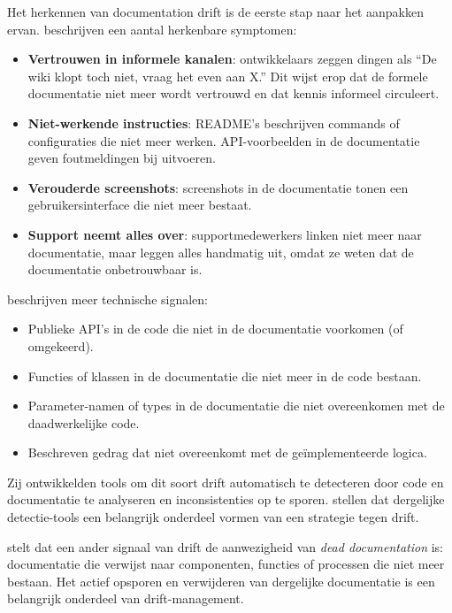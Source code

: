 Het herkennen van documentation drift is de eerste stap naar het aanpakken ervan. \textcite{bhatti2021docsdevelopers} beschrijven een aantal herkenbare symptomen:

\begin{itemize}
    \item \textbf{Vertrouwen in informele kanalen}: ontwikkelaars zeggen dingen als ``De wiki klopt toch niet, vraag het even aan X.'' Dit wijst erop dat de formele documentatie niet meer wordt vertrouwd en dat kennis informeel circuleert.
    \item \textbf{Niet-werkende instructies}: README's beschrijven commands of configuraties die niet meer werken. API-voorbeelden in de documentatie geven foutmeldingen bij uitvoeren.
    \item \textbf{Verouderde screenshots}: screenshots in de documentatie tonen een gebruikersinterface die niet meer bestaat.
    \item \textbf{Support neemt alles over}: supportmedewerkers linken niet meer naar documentatie, maar leggen alles handmatig uit, omdat ze weten dat de documentatie onbetrouwbaar is.
\end{itemize}

\textcite{romeo2024didrift} beschrijven meer technische signalen:

\begin{itemize}
    \item Publieke API's in de code die niet in de documentatie voorkomen (of omgekeerd).
    \item Functies of klassen in de documentatie die niet meer in de code bestaan.
    \item Parameter-namen of types in de documentatie die niet overeenkomen met de daadwerkelijke code.
    \item Beschreven gedrag dat niet overeenkomt met de geïmplementeerde logica.
\end{itemize}

Zij ontwikkelden tools om dit soort drift automatisch te detecteren door code en documentatie te analyseren en inconsistenties op te sporen. \textcite{whiting2020drifterosion} stellen dat dergelijke detectie-tools een belangrijk onderdeel vormen van een strategie tegen drift.

\textcite{martraire2019livingdocumentation} stelt dat een ander signaal van drift de aanwezigheid van \textit{dead documentation} is: documentatie die verwijst naar componenten, functies of processen die niet meer bestaan. Het actief opsporen en verwijderen van dergelijke documentatie is een belangrijk onderdeel van drift-management.

